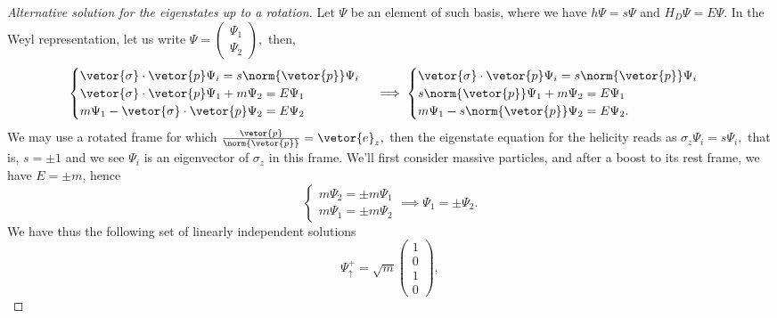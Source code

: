 \begin{proof}[Alternative solution for the eigenstates up to a rotation]
   Let \(\Psi\) be an element of such basis, where we have \(h \Psi = s \Psi\) and \(H_D \Psi = E \Psi.\) In the Weyl representation, let us write \(\Psi = \left(\begin{smallmatrix}
         \Psi_1\\
         \Psi_2
   \end{smallmatrix}\right),\) then,
   \begin{equation*}
      \begin{cases}
         \vetor{\sigma}\cdot \vetor{p} \Psi_i = s \norm{\vetor{p}} \Psi_i\\
         \vetor{\sigma} \cdot \vetor{p} \Psi_1 + m \Psi_2 = E \Psi_1\\
         m \Psi_1 - \vetor{\sigma} \cdot \vetor{p} \Psi_2 = E \Psi_2
      \end{cases}
      \implies
      \begin{cases}
         \vetor{\sigma}\cdot \vetor{p} \Psi_i = s \norm{\vetor{p}} \Psi_i\\
         s \norm{\vetor{p}} \Psi_1 + m \Psi_2 = E \Psi_1\\
         m \Psi_1 - s \norm{\vetor{p}} \Psi_2 = E \Psi_2.
      \end{cases}
   \end{equation*}
   We may use a rotated frame for which \(\frac{\vetor{p}}{\norm{\vetor{p}}} = \vetor{e}_z,\) then the eigenstate equation for the helicity reads as \(\sigma_z \Psi_i = s \Psi_i,\) that is, \(s = \pm 1\) and we see \(\Psi_i\) is an eigenvector of \(\sigma_z\) in this frame. We'll first consider massive particles, and after a boost to its rest frame, we have \(E = \pm m\), hence
   \begin{equation*}
      \begin{cases}
         m \Psi_2 = \pm m \Psi_1\\
         m \Psi_1 = \pm m \Psi_2
      \end{cases} \implies \Psi_1 = \pm \Psi_2.
   \end{equation*}
   We have thus the following set of linearly independent solutions
   \begin{equation*}
      \Psi^+_\uparrow = \sqrt{m} \begin{pmatrix}
         1 \\ 0\\1 \\ 0
      \end{pmatrix},

\end{equation*}
\end{proof}
